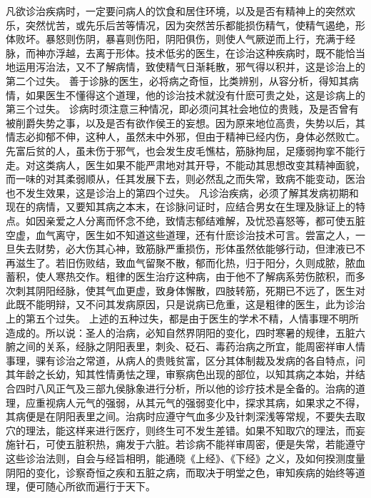 \documentclass[a4paper,12pt,UTF8,twoside]{ctexbook}
\begin{document}
凡欲诊治疾病时，一定要问病人的饮食和居住环境，以及是否有精神上的突然欢乐，突然忧苦，或先乐后苦等情况，因为突然苦乐都能损伤精气，使精气遏绝，形体败坏。暴怒则伤阴，暴喜则伤阳，阴阳俱伤，则使人气厥逆而上行，充满于经脉，而神亦浮越，去离于形体。技术低劣的医生，在诊治这种疾病时，既不能恰当地运用泻治法，又不了解病情，致使精气日渐耗散，邪气得以积并，这是诊治上的第二个过失。
善于诊脉的医生，必将病之奇恒，比类辨别，从容分析，得知其病情，如果医生不懂得这个道理，他的诊治技术就没有什麽可贵之处，这是诊病上的第三个过失。
诊病时须注意三种情况，即必须问其社会地位的贵贱，及是否曾有被削爵失势之事，以及是否有欲作侯王的妄想。因为原来地位高贵，失势以后，其情志必抑郁不伸，这种人，虽然未中外邪，但由于精神已经内伤，身体必然败亡。先富后贫的人，虽未伤于邪气，也会发生皮毛憔枯，筋脉拘屈，足痿弱拘挛不能行走。对这类病人，医生如果不能严肃地对其开导，不能动其思想改变其精神面貌，而一味的对其柔弱顺从，任其发展下去，则必然乱之而失常，致病不能变动，医治也不发生效果，这是诊治上的第四个过失。
凡诊治疾病，必须了解其发病初期和现在的病情，又要知其病之本末，在诊脉问证时，应结合男女在生理及脉证上的特点。如因亲爱之人分离而怀念不绝，致情志郁结难解，及忧恐喜怒等，都可使五脏空虚，血气离守，医生如不知道这些道理，还有什麽诊治技术可言。尝富之人，一旦失去财势，必大伤其心神，致筋脉严重损伤，形体虽然依能够行动，但津液已不再滋生了。若旧伤败结，致血气留聚不散，郁而化热，归于阳分，久则成脓，脓血蓄积，使人寒热交作。粗律的医生治疗这种病，由于他不了解病系劳伤脓积，而多次刺其阴阳经脉，使其气血更虚，致身体懈散，四肢转筋，死期已不远了，医生对此既不能明辩，又不问其发病原因，只是说病已危重，这是粗律的医生，此为诊治上的第五个过失。
上述的五种过失，都是由于医生的学术不精，人情事理不明所造成的。所以说：圣人的治病，必知自然界阴阳的变化，四时寒暑的规律，五脏六腑之间的关系，经脉之阴阳表里，刺灸、砭石、毒药治病之所宜，能周密祥审人情事理，骒有诊治之常道，从病人的贵贱贫富，区分其体制裁及发病的各自特点，问其年龄之长幼，知其性情勇怯之理，审察病色出现的部位，以知其病之本始，并结合四时八风正气及三部九侯脉象进行分析，所以他的诊疗技术是全备的。治病的道理，应重视病人元气的强弱，从其元气的强弱变化中，探求其病，如果求之不得，其病便是在阴阳表里之间。治病时应遵守气血多少及针刺深浅等常规，不要失去取穴的理法，能这样来进行医疗，则终生可不发生差错。如果不知取穴的理法，而妄施针石，可使五脏积热，痈发于六脏。若诊病不能祥审周密，便是失常，若能遵守这些诊治法则，自会与经旨相明，能通晓《上经》、《下经》之义，及如何揆测度量阴阳的变化，诊察奇恒之疾和五脏之病，而取决于明堂之色，审知疾病的始终等道理，便可随心所欲而遍行于天下。
\end{document}
